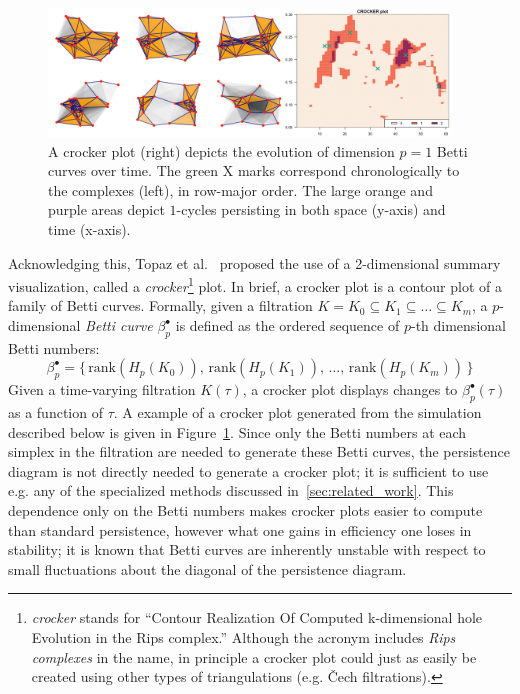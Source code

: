 \documentclass[sn-mathphys]{sn-jnl}
\begin{document}
\begin{figure}[t]
	\centering
	\includegraphics[width=0.95\textwidth]{crocker_combo_1.png}
	\caption{A crocker plot (right) depicts the evolution of dimension $p = 1$ Betti curves over time. The green $\mathrm{X}$ marks correspond chronologically to the complexes (left), in row-major order. The large orange and purple areas depict $1$-cycles persisting in both space (y-axis) and time (x-axis).} \label{fig:crocker1}
\end{figure}

Acknowledging this, Topaz et al.~\cite{topaz2015topological} proposed the use of a 2-dimensional summary visualization, called a \emph{crocker}\footnote{\emph{crocker} stands for ``Contour Realization Of Computed k-dimensional hole Evolution in the Rips complex.'' Although the acronym includes \emph{Rips complexes} in the name, in principle a crocker plot could just as easily be created using other types of triangulations (e.g. \v{C}ech filtrations).} plot. 
In brief, a crocker plot is a contour plot of a family of Betti curves. Formally, given a filtration $K = K_0 \subseteq K_1 \subseteq \dots \subseteq K_m$, a $p$-dimensional \emph{Betti curve} $\beta_p^{\bullet}$ is defined as the ordered sequence of $p$-th dimensional Betti numbers:
$$ \beta_p^\bullet = \{ \, \mathrm{rank}(H_p(K_0)), \, \mathrm{rank}(H_p(K_1)), \, \dots, \, \mathrm{rank}(H_p(K_m))\, \}$$
Given a time-varying filtration $K(\tau)$, a crocker plot displays changes to $\beta_p^\bullet(\tau)$ as a function of $\tau$. A example of a crocker plot generated from the simulation described below is given in Figure~\ref{fig:crocker1}. Since only the Betti numbers at each simplex in the filtration are needed to generate these Betti curves, the persistence diagram is not directly needed to generate a crocker plot; it is sufficient to use e.g. any of the specialized methods discussed in~\ref{sec:related_work}. This dependence only on the Betti numbers makes crocker plots easier to compute than standard persistence, however what one gains in efficiency one loses in stability; it is known that Betti curves are inherently unstable with respect to small fluctuations about the diagonal of the persistence diagram. 
\end{document}

